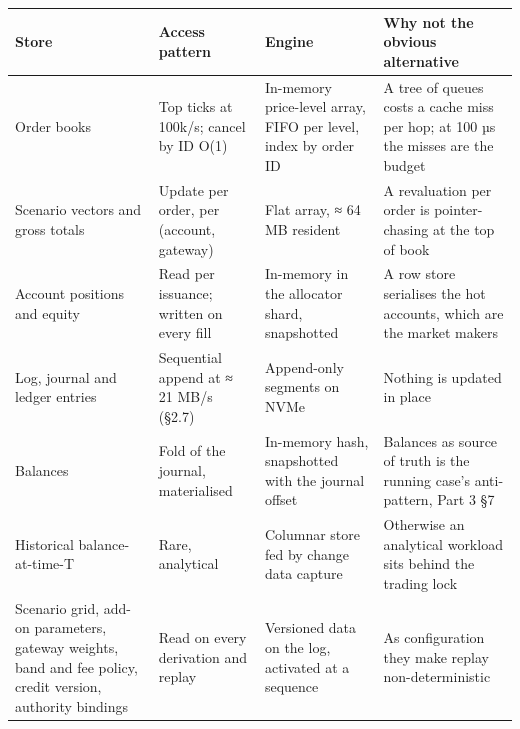 \documentclass[10pt,a4paper]{article}
\newcounter{none}  %
\begin{document}
{\def\LTcaptype{none} %
\begin{longtable}[]{@{}
  >{\raggedright\arraybackslash}p{}
  >{\raggedright\arraybackslash}p{}
  >{\raggedright\arraybackslash}p{}
  >{\raggedright\arraybackslash}p{}@{}}
\toprule\noalign{}
\begin{minipage}[b]{\linewidth}\raggedright
Store
\end{minipage} & \begin{minipage}[b]{\linewidth}\raggedright
Access pattern
\end{minipage} & \begin{minipage}[b]{\linewidth}\raggedright
Engine
\end{minipage} & \begin{minipage}[b]{\linewidth}\raggedright
Why not the obvious alternative
\end{minipage} \\
\midrule\noalign{}
\endhead
\bottomrule\noalign{}
\endlastfoot
Order books & Top ticks at 100k/s; cancel by ID O(1) & In-memory price-level array, FIFO per level, index by order ID & A tree of queues costs a cache miss per hop; at 100 µs the misses are the budget \\
Scenario vectors and gross totals & Update per order, per (account, gateway) & Flat array, ≈ 64 MB resident & A revaluation per order is pointer-chasing at the top of book \\
Account positions and equity & Read per issuance; written on every fill & In-memory in the allocator shard, snapshotted & A row store serialises the hot accounts, which are the market makers \\
Log, journal and ledger entries & Sequential append at ≈ 21 MB/s (§2.7) & Append-only segments on NVMe & Nothing is updated in place \\
Balances & Fold of the journal, materialised & In-memory hash, snapshotted with the journal offset & Balances as source of truth is the running case's anti-pattern, Part 3 §7 \\
Historical balance-at-time-T & Rare, analytical & Columnar store fed by change data capture & Otherwise an analytical workload sits behind the trading lock \\
Scenario grid, add-on parameters, gateway weights, band and fee policy, credit version, authority bindings & Read on every derivation and replay & Versioned data on the log, activated at a sequence & As configuration they make replay non-deterministic \\
\end{longtable}
}
\end{document}

